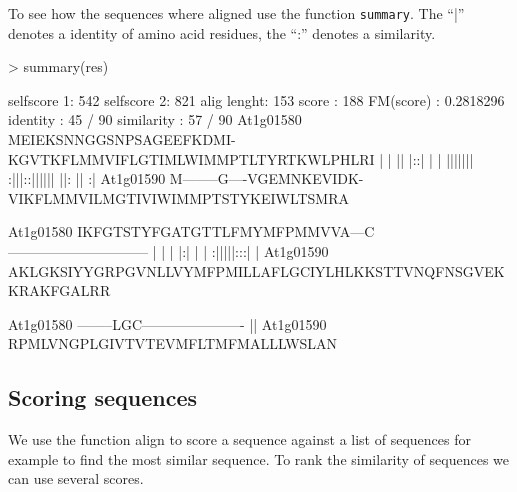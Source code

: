 \documentclass{article}
\begin{document}
To see how the sequences where aligned use the function \texttt{summary}. The ``|'' denotes a identity of amino acid residues, the ``:'' denotes a similarity.
\begin{Schunk}
\begin{Sinput}
> summary(res)
\end{Sinput}
\begin{Soutput}
selfscore 1:  542 
selfscore 2:  821 
alig lenght:  153 
score      :  188 
FM(score)  :  0.2818296 
identity   :  45 / 90 
similarity :  57 / 90 
At1g01580 MEIEKSNNGGSNPSAGEEFKDMI-KGVTKFLMMVIFLGTIMLWIMMPTLTYRTKWLPHLRI 
          |        |     ||  |::| | | ||||||| :|||::|||||| ||:  ||  :|  
At1g01590 M--------G----VGEMNKEVIDK-VIKFLMMVILMGTIVIWIMMPTSTYKEIWLTSMRA 

At1g01580 IKFGTSTYFGATGTTLFMYMFPMMVVA---C------------------------------ 
           | | | |:|  |  | :|||||:::|   |                               
At1g01590 AKLGKSIYYGRPGVNLLVYMFPMILLAFLGCIYLHLKKSTTVNQFNSGVEKKRAKFGALRR 

At1g01580 --------LGC---------------------- 
                  ||                        
At1g01590 RPMLVNGPLGIVTVTEVMFLTMFMALLLWSLAN 
\end{Soutput}
\end{Schunk}

\subsection{Scoring sequences}

We use the function align to score a sequence against a list of sequences for example to find the most similar sequence.
To rank the similarity of sequences we can use several scores.
\end{document}
